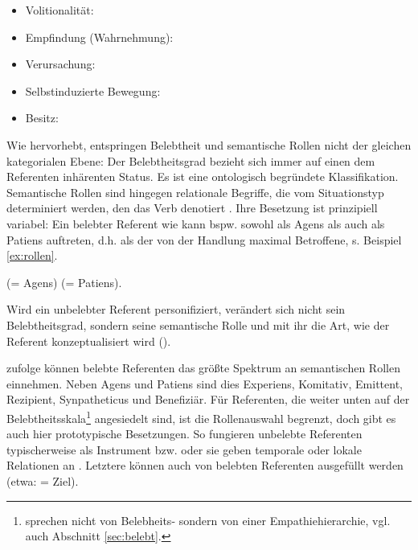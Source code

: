 \begin{itemize}
\item Volitionalität: 
\item Empfindung (Wahrnehmung):   
\item Verursachung:   
\item Selbstinduzierte Bewegung:  
\item Besitz: 
\end{itemize}

Wie \textcite[][151f.]{Yamamoto1999} hervorhebt, entspringen Belebtheit und semantische Rollen nicht der gleichen kategorialen Ebene: Der Belebtheitsgrad bezieht sich immer auf einen dem Referenten inhärenten Status. Es ist eine ontologisch begründete Klassifikation. Semantische Rollen sind hingegen relationale Begriffe, die vom Situationstyp determiniert werden, den das Verb denotiert \parencite[13]{Lehmann2004a}. Ihre Besetzung ist prinzipiell variabel: Ein belebter Referent wie  kann bspw. sowohl als Agens als auch als Patiens auftreten, d.h. als der von der Handlung maximal Betroffene, s. Beispiel \ref{ex:rollen}. 
 
\begin{exe}
	\ex \label{ex:rollen}
	\begin{xlist}
	 	\ex {} (= Agens) 
		\ex {} (= Patiens).
 
	\end{xlist}
\end{exe}
\noindent
 
Wird ein unbelebter Referent personifiziert, verändert sich nicht sein Belebtheitsgrad, sondern seine semantische Rolle und mit ihr die Art, wie  der Referent konzeptualisiert wird (). 

\textcite[12]{Lehmann2004a} zufolge können belebte Referenten das größte Spektrum an semantischen Rollen einnehmen. Neben Agens und Patiens sind dies Experiens, Komitativ, Emittent, Rezipient, Synpatheticus und Benefiziär.  Für Referenten, die weiter unten auf der Belebtheitsskala\footnote{\textcite{Lehmann2004a} sprechen nicht von Belebheits- sondern von einer 
Empathiehierarchie, vgl. auch Abschnitt \ref{sec:belebt}.} angesiedelt sind, ist die Rollenauswahl begrenzt, doch gibt es auch hier prototypische Besetzungen. So fungieren unbelebte Referenten typischerweise als Instrument bzw.  oder sie geben temporale oder lokale Relationen an \parencite[76]{Primus2012}. Letztere können auch von belebten Referenten ausgefüllt werden (etwa:  = Ziel). 

